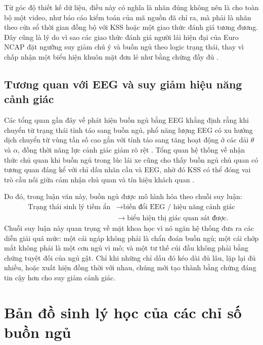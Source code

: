 \documentclass[12pt,a4paper]{article}
\begin{document}
Từ góc độ thiết kế dữ liệu, điều này có nghĩa là nhãn đúng không nên là  cho toàn bộ một video, như báo cáo kiểm toán của mã nguồn đã chỉ ra, mà phải là nhãn theo cửa sổ thời gian đồng bộ với KSS hoặc một giao thức đánh giá tương đương. Đây cũng là lý do vì sao các giao thức đánh giá người lái hiện đại của Euro NCAP đặt ngưỡng suy giảm chú ý và buồn ngủ theo logic trạng thái, thay vì chấp nhận một biểu hiện khuôn mặt đơn lẻ như bằng chứng đầy đủ \cite{euroncapsd201,euroncapsd202}.

\subsection{Tương quan với EEG và suy giảm hiệu năng cảnh giác}
Các tổng quan gần đây về phát hiện buồn ngủ bằng EEG khẳng định rằng khi chuyển từ trạng thái tỉnh táo sang buồn ngủ, phổ năng lượng EEG có xu hướng dịch chuyển từ vùng tần số cao gắn với tỉnh táo sang tăng hoạt động ở các dải \(\theta\) và \(\alpha\), đồng thời năng lực cảnh giác giảm rõ rệt \cite{hussein2023}. Tổng quan hệ thống về nhận thức chủ quan khi buồn ngủ trong lúc lái xe cũng cho thấy buồn ngủ chủ quan có tương quan đáng kể với chỉ dấu nhãn cầu và EEG, nhờ đó KSS có thể đóng vai trò cầu nối giữa cảm nhận chủ quan và tín hiệu khách quan \cite{awareness2021}.

Do đó, trong luận văn này, buồn ngủ được mô hình hóa theo chuỗi suy luận:
\[
\begin{aligned}
\text{Trạng thái sinh lý tiềm ẩn}
&\rightarrow \text{biến đổi EEG / hiệu năng cảnh giác} \\
&\rightarrow \text{biểu hiện thị giác quan sát được}.
\end{aligned}
\]
Chuỗi suy luận này quan trọng về mặt khoa học vì nó ngăn hệ thống đưa ra các diễn giải quá mức: một cái ngáp không phải là chẩn đoán buồn ngủ; một cái chớp mắt không phải là một cơn ngủ vi mô; và một tư thế cúi đầu không phải bằng chứng tuyệt đối của ngủ gật. Chỉ khi những chỉ dấu đó kéo dài đủ lâu, lặp lại đủ nhiều, hoặc xuất hiện đồng thời với nhau, chúng mới tạo thành bằng chứng đáng tin cậy hơn cho suy giảm cảnh giác.

\section{Bản đồ sinh lý học của các chỉ số buồn ngủ}
\end{document}
